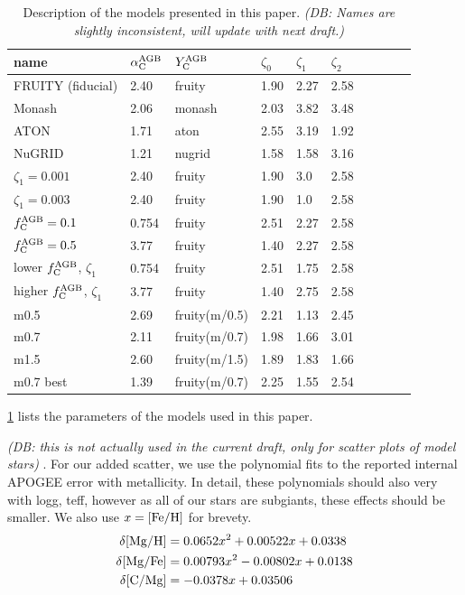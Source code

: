 \documentclass[fleqn,
referee, %
usenatbib]{mnras}
\newcommand{\fagb}{f_{\rm C}^{\rm AGB}}
\newcommand{\zetai}{\zeta_{1}}
\newcommand{\dbnote}[1]{ {\color{Thistle} \textit{\small (DB: #1)}} }
\begin{document}
\begin{table}
	\centering
        \caption[]{Description of the models presented in this paper. \dbnote{Names are slightly inconsistent, will update with next draft.}}
	\label{tab:model_parameters}

	\begin{tabular}{l l l l l l l l l l}
		\hline
            name & $\alpha_{\rm C}^{\rm AGB}$ & $Y_{\rm C}^{\rm AGB}$ & $\zeta_0$ & $\zeta_1$ & $\zeta_2$ \\ 
            \hline
            FRUITY (fiducial) & 2.40 & fruity & 1.90 & 2.27 & 2.58 \\
            Monash & 2.06 & monash & 2.03 & 3.82 & 3.48 \\
            ATON & 1.71 & aton & 2.55 & 3.19 & 1.92 \\
            NuGRID & 1.21 & nugrid & 1.58 & 1.58 & 3.16 \\
            $\zetai=0.001$ & 2.40 & fruity & 1.90 & 3.0 & 2.58 \\
            $\zetai=0.003$ & 2.40 & fruity & 1.90 & 1.0 & 2.58 \\
            $\fagb=0.1$ & 0.754 & fruity & 2.51 & 2.27 & 2.58  \\
            $\fagb=0.5$ & 3.77 & fruity & 1.40 & 2.27 & 2.58 \\
            lower $\fagb$, $\zetai$ & 0.754 & fruity & 2.51 & 1.75 & 2.58  \\
            higher $\fagb$, $\zetai$ & 3.77 & fruity & 1.40 & 2.75 & 2.58 \\
            m0.5 & 2.69 & fruity(m/0.5)  & 2.21 & 1.13 & 2.45 \\
            m0.7 & 2.11 & fruity(m/0.7) & 1.98 & 1.66 & 3.01 \\
            m1.5 & 2.60 & fruity(m/1.5) & 1.89 & 1.83 & 1.66 \\
            m0.7 best & 1.39 & fruity(m/0.7) & 2.25 & 1.55 & 2.54 \\
		\hline
	\end{tabular}
\end{table}


\ref{tab:model_parameters} lists the parameters of the models used in this paper.

\dbnote{this is not actually used in the current draft, only for scatter plots of model stars}. For our added scatter, we use the polynomial fits to the reported internal APOGEE error with metallicity. In detail, these polynomials should also very with logg, teff, however as all of our stars are subgiants, these effects should be smaller. We also use $x={\rm [Fe/H]}$ for brevety.
\begin{subequations}
\begin{align}
    \delta {\rm [Mg/H]} &= 0.0652 x^2 + 0.00522 x + 0.0338 \\
    \delta {\rm [Mg/Fe]} &= 0.00793 x^2 - 0.00802 x + 0.0138 \\
    \delta {\rm [C/Mg]} &= -0.0378x + 0.03506 
\end{align}
\end{subequations}
\end{document}
